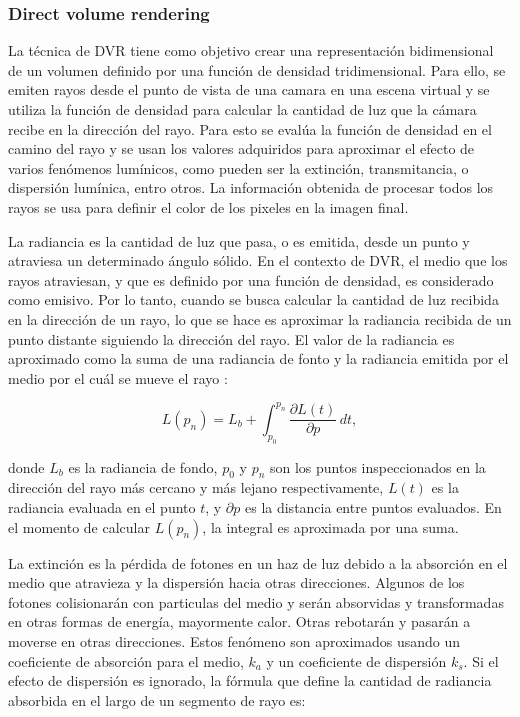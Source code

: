 \documentclass[oneside,a4paper,spanish,links]{amca}
\begin{document}
\subsubsection{Direct volume rendering}

La técnica de DVR tiene como objetivo crear una representación
bidimensional de un volumen definido por una función de densidad
tridimensional. Para ello, se emiten rayos desde el punto de vista de
una camara en una escena virtual y se utiliza la función de densidad
para calcular la cantidad de luz que la cámara recibe en la dirección
del rayo. Para esto se evalúa la función de densidad en el camino del
rayo y se usan los valores adquiridos para aproximar el efecto de
varios fenómenos lumínicos, como pueden ser la extinción,
transmitancia, o dispersión lumínica, entro otros. La información
obtenida de procesar todos los rayos se usa para definir el color de
los pixeles en la imagen final.

La radiancia es la cantidad de luz que pasa, o es emitida, desde un
punto y atraviesa un determinado ángulo sólido. En el contexto de DVR,
el medio que los rayos atraviesan, y que es definido por una función
de densidad, es considerado como emisivo. Por lo tanto, cuando se
busca calcular la cantidad de luz recibida en la dirección de un rayo,
lo que se hace es aproximar la radiancia recibida de un punto distante
siguiendo la dirección del rayo. El valor de la radiancia es
aproximado como la suma de una radiancia de fonto y la radiancia
emitida por el medio por el cuál se mueve el rayo \citep{Kratz2006} :

\begin{equation} \label{eq:general_radiance}  
  L(p_n) = L_b + \int_{p_0}^{p_n} \frac{\partial L(t)}{\partial p} \, dt,
\end{equation}

\noindent donde $L_b$ es la radiancia de fondo, $p_0$ y $p_n$ son los
puntos inspeccionados en la dirección del rayo más cercano y más
lejano respectivamente, $L(t)$ es la radiancia evaluada en el punto
$t$, y $\partial p$ es la distancia entre puntos evaluados. En el
momento de calcular $L(p_n)$, la integral es aproximada por una suma.

La extinción es la pérdida de fotones en un haz de luz debido a la
absorción en el medio que atravieza y la dispersión hacia otras
direcciones. Algunos de los fotones colisionarán con particulas del
medio y serán absorvidas y transformadas en otras formas de energía,
mayormente calor. Otras rebotarán y pasarán a moverse en otras
direcciones. Estos fenómeno son aproximados usando un coeficiente de
absorción para el medio, $k_a$ y un coeficiente de dispersión
$k_s$. Si el efecto de dispersión es ignorado, la fórmula que define
la cantidad de radiancia absorbida en el largo de un segmento de rayo
es: 
\end{document}
